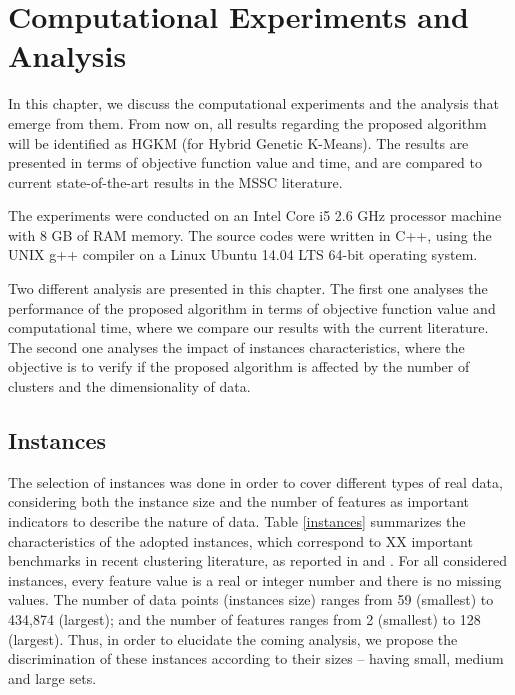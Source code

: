 \chapter{Computational Experiments and Analysis}
\label{chap:experiments}
In this chapter, we discuss the computational experiments and the analysis that emerge from them. From now on, all results regarding the proposed algorithm will be identified as HGKM (for Hybrid Genetic K-Means). The results are presented in terms of objective function value and time, and are compared to current state-of-the-art results in the MSSC literature.

The experiments were conducted on an Intel Core i5 2.6 GHz processor machine with 8 GB of RAM memory. The source codes were written in C++, using the UNIX g++ compiler on a Linux Ubuntu 14.04 LTS 64-bit operating system.

Two different analysis are presented in this chapter. The first one analyses the performance of the proposed algorithm in terms of objective function value and computational time, where we compare our results with the current literature. The second one analyses the impact of instances characteristics, where the objective is to verify if the proposed algorithm is affected by the number of clusters and the dimensionality of data.

\section{Instances}
\label{sec:instances}
The selection of instances was done in order to cover different types of real data, considering both the instance size and the number of features as important indicators to describe the nature of data. Table \ref{instances} summarizes the characteristics of the adopted instances, which correspond to XX important benchmarks in recent clustering literature, as reported in \cite{Ordin2014} and \cite{Bagirov2016}. For all considered instances, every feature value is a real or integer number and there is no missing values. The number of data points (instances size) ranges from 59 (smallest) to 434,874 (largest); and the number of features ranges from 2 (smallest) to 128 (largest). Thus, in order to elucidate the coming analysis, we propose the discrimination of these instances according to their sizes -- having small, medium and large sets. %



